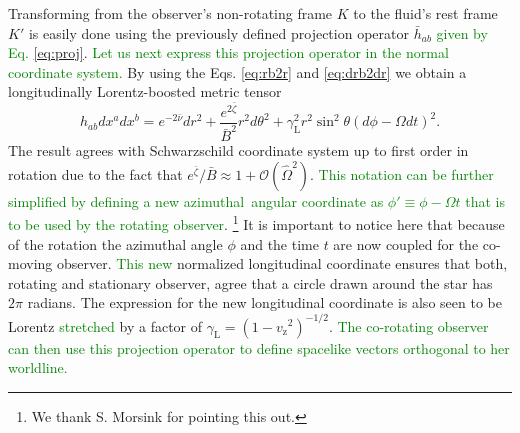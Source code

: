 \documentclass{aa}
\newcommand{\be}{\begin{equation}}
\newcommand{\ee}{\end{equation}}
\newcommand{\refe}[1]{\textcolor{green}{{#1}}}
\newcommand{\sch}{Schwarzschild }
\newcommand{\rb}{\ensuremath{\bar{r}}}
\newcommand{\Ob}{\ensuremath{\hat{\Omega}}}
\newcommand{\nub}{\ensuremath{\bar{\nu}}}
\newcommand{\zetab}{\ensuremath{\bar{\zeta}}}
\newcommand{\Bb}{\ensuremath{\bar{B}}}
\newcommand{\vz}{\ensuremath{v_{\mathrm{z}}}}
\newcommand{\lgamma}{\gamma_{\text{L}}}
\begin{document}
Transforming from the observer's non-rotating frame $K$ to the fluid's rest frame $K'$ is easily done using the previously defined projection operator $\bar{h}_{ab}$ \refe{given by Eq. \eqref{eq:proj}}.
\refe{Let us next express this projection operator in the normal coordinate system.}
By using the Eqs. \eqref{eq:rb2r} and \eqref{eq:drb2dr} we obtain a longitudinally Lorentz-boosted metric tensor 
\be \label{eq:gammaSch} 
h_{ab} dx^a dx^b = e^{-2\nub}dr^2 + \frac{e^{2\zetab}}{\Bb^2} r^2 d\theta^2 + \lgamma^2 r^2 \sin^2\theta (d\phi - \Omega dt)^2.
\ee 
The result agrees with \sch coordinate system up to first order in rotation due to the fact that $e^{\zetab}/\Bb \approx 1 + \mathcal{O}(\Ob^2)$.  
\refe{This notation can be further simplified by defining a new azimuthal angular coordinate as $\phi' \equiv \phi - \Omega t$ that is to be used by the rotating observer}.%
\footnote{We thank S. Morsink for pointing this out.}
It is important to notice here that because of the rotation the azimuthal angle $\phi$ and the time $t$ are now coupled for the co-moving observer.
\refe{This new} normalized longitudinal coordinate ensures that both, rotating and stationary observer, agree that a circle drawn around the star has $2\pi$ radians.
The expression for the new longitudinal coordinate is also seen to be Lorentz \refe{stretched} by a factor of $\lgamma = (1-\vz^2)^{-1/2}$.
\refe{The co-rotating observer can then use this projection operator to define spacelike vectors orthogonal to her worldline.}
\end{document}
